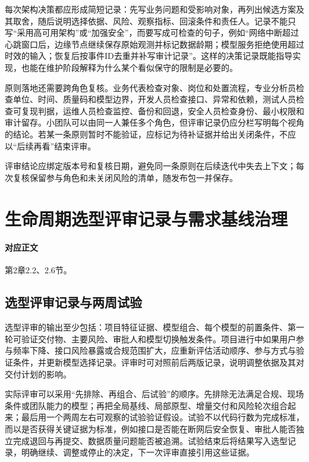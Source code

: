 每次架构决策都应形成简短记录：先写业务问题和受影响对象，再列出候选方案及其取舍，随后说明选择依据、风险、观察指标、回滚条件和责任人。记录不能只写“采用高可用架构”或“加强安全”，而要写成可检查的句子，例如“网络中断超过心跳窗口后，边缘节点继续保存原始观测并标记数据龄期；模型服务拒绝使用超过时效的输入；恢复后按事件ID去重并补写审计记录”。这样的决策记录既能指导实现，也能在维护阶段解释为什么某个看似保守的限制是必要的。

原则落地还需要跨角色复核。业务代表检查对象、岗位和处置流程，专业分析员检查单位、时间、质量码和模型边界，开发人员检查接口、异常和依赖，测试人员检查可复现判据，运维人员检查监控、备份和回退，安全人员检查身份、最小权限和审计留存。小团队可以由同一人兼任多个角色，但评审记录仍应分栏写明每个视角的结论。若某一条原则暂时不能验证，应标记为待补证据并给出关闭条件，不应以“后续再看”结束评审。

评审结论应绑定版本号和复核日期，避免同一条原则在后续迭代中失去上下文；每次复核保留参与角色和未关闭风险的清单，随发布包一并保存。


\section{生命周期选型评审记录与需求基线治理}\label{app:ext-ch02-baseline-governance}\label{online:ch02}

\paragraph{对应正文}第2章2.2、2.6节。

\subsection{选型评审记录与两周试验}

选型评审的输出至少包括：项目特征证据、模型组合、每个模型的前置条件、第一轮可验证交付物、主要风险、审批人和模型切换触发条件。项目进行中如果用户参与频率下降、接口风险暴露或合规范围扩大，应重新评估活动顺序、参与方式与验证条件，并更新模型选择记录。评审时可对照前后两版记录，说明调整依据及其对交付计划的影响。

实际评审可以采用“先排除、再组合、后试验”的顺序。先排除无法满足合规、现场条件或团队能力的模型；再把全局基线、局部原型、增量交付和风险轮次组合起来；最后用一个两周左右可观察的试验验证假设。试验不以代码行数为完成标准，而以是否获得关键证据为标准，例如接口是否能在断网后安全恢复、审批人能否独立完成退回与再提交、数据质量问题能否被追溯。试验结束后将结果写入选型记录，明确继续、调整或停止的决定，下一次评审直接引用这些证据。

